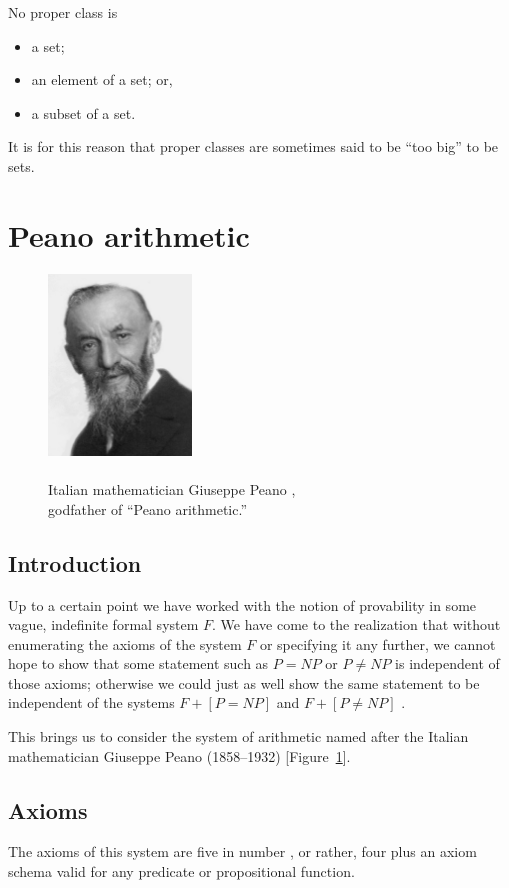 \documentclass[letterpaper]{article}
\begin{document}
\begin{remark}
No proper class is
\begin{itemize}
	\item a set;
	\item an element of a set; or,
	\item a subset of a set.
\end{itemize}
It is for this reason that proper classes are sometimes said to be ``too big'' to be sets.
\end{remark}
\section{Peano arithmetic}\label{sect-pa}
\begin{figure}
	\centering
	\includegraphics[width=1.5in]{images/Giuseppe_Peano.jpg}
	\caption[Giuseppe Peano]{~\\Italian mathematician Giuseppe Peano \cite{peano-photo},\\godfather of ``Peano arithmetic.''}
	\label{peanophoto}
\end{figure}
\subsection{Introduction}
Up to a certain point we have worked with the notion of provability in some vague, indefinite formal system $F$.  We have come to the realization that without enumerating the axioms of the system $F$ or specifying it any further, we cannot hope to show that some statement such as $P=NP$ or $P\ne NP$ is independent of those axioms; otherwise we could just as well show the same statement to be independent of the systems $F+[P=NP]$ and $F+[P\ne NP]$ \cite{spector2016ans}.

This brings us to consider the system of arithmetic named after the Italian mathematician Giuseppe Peano (1858--1932) [Figure~\ref{peanophoto}].
\subsection{Axioms}
The axioms of this system are five in number \cite[p.~149]{haowang1957}, or rather, four plus an axiom schema valid for any predicate or propositional function.
\end{document}
